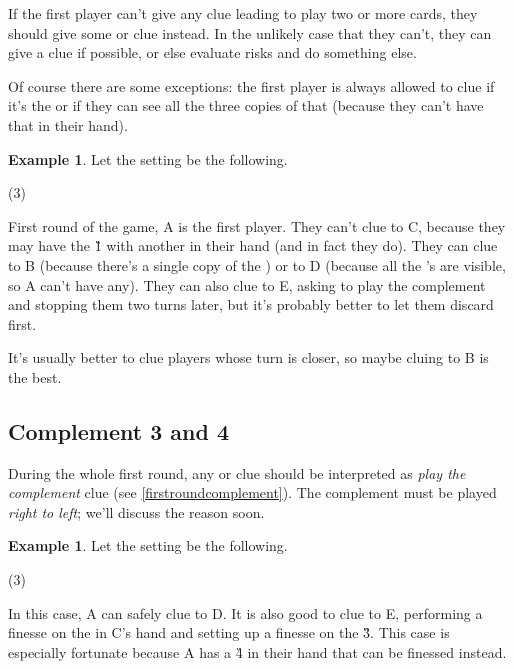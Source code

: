 \documentclass[a4paper]{article}
\theoremstyle{plain}
\theoremstyle{definition}
\newtheorem{example}[theorem]{Example}
\begin{document}
If the first player can't give any clue leading to play two or more cards, they should give some  or  clue instead. In the unlikely case that they can't, they can give a  clue if possible, or else evaluate risks and do something else.

Of course there are some exceptions: the first player is always allowed to clue  if it's the  or if they can see all the three copies of that  (because they can't have that  in their hand).

\begin{example}
	
	Let the setting be the following.
	
	\begin{tasks}(3)
		\task[+]      
		\task[A]    
		\task[B]    
		\task[C]    
		\task[D]    
		\task[E]    
	\end{tasks}
	
	First round of the game, A is the first player. They can't clue  to C, because they may have the \G{1} with another  in their hand (and in fact they do). They can clue  to B (because there's a single copy of the ) or to D (because all the 's are visible, so A can't have any). They can also clue  to E, asking to play the complement and stopping them two turns later, but it's probably better to let them discard first.
	
	It's usually better to clue players whose turn is closer, so maybe cluing  to B is the best.
\end{example}

\subsection{Complement 3 and 4}

During the whole first round, any  or  clue should be interpreted as \textit{play the complement} clue (see \ref{firstroundcomplement}). The complement must be played \textit{right to left}; we'll discuss the reason soon.

\begin{example}
	
	Let the setting be the following.
	
	\begin{tasks}(3)
		\task[+]      
		\task[A]    
		\task[B]    
		\task[C]    
		\task[D]    
		\task[E]    
	\end{tasks}
	
	In this case, A can safely clue  to D. It is also good to clue  to E, performing a finesse on the  in C's hand and setting up a finesse on the \G{3}. This case is especially fortunate because A has a \G{4} in their hand that can be finessed instead.
\end{example}
\end{document}
